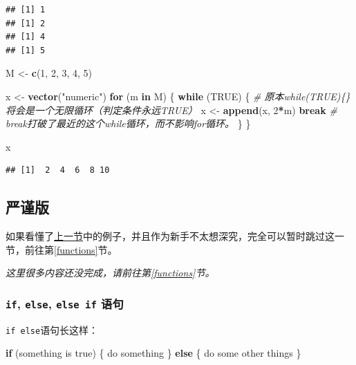 \documentclass[]{book}
\newenvironment{Shaded}{\begin{snugshade}}{\end{snugshade}}
\newcommand{\CommentTok}[1]{\textcolor[rgb]{0.56,0.35,0.01}{\textit{#1}}}
\newcommand{\ControlFlowTok}[1]{\textcolor[rgb]{0.13,0.29,0.53}{\textbf{#1}}}
\newcommand{\DecValTok}[1]{\textcolor[rgb]{0.00,0.00,0.81}{#1}}
\newcommand{\KeywordTok}[1]{\textcolor[rgb]{0.13,0.29,0.53}{\textbf{#1}}}
\newcommand{\NormalTok}[1]{#1}
\newcommand{\OperatorTok}[1]{\textcolor[rgb]{0.81,0.36,0.00}{\textbf{#1}}}
\newcommand{\OtherTok}[1]{\textcolor[rgb]{0.56,0.35,0.01}{#1}}
\newcommand{\StringTok}[1]{\textcolor[rgb]{0.31,0.60,0.02}{#1}}
\begin{document}
\begin{verbatim}
## [1] 1
## [1] 2
## [1] 4
## [1] 5
\end{verbatim}

\begin{Shaded}
\begin{Highlighting}[]
\NormalTok{M <-}\StringTok{ }\KeywordTok{c}\NormalTok{(}\DecValTok{1}\NormalTok{, }\DecValTok{2}\NormalTok{, }\DecValTok{3}\NormalTok{, }\DecValTok{4}\NormalTok{, }\DecValTok{5}\NormalTok{)}

\NormalTok{x <-}\StringTok{ }\KeywordTok{vector}\NormalTok{(}\StringTok{"numeric"}\NormalTok{)}
\ControlFlowTok{for}\NormalTok{ (m }\ControlFlowTok{in}\NormalTok{ M) \{}
  \ControlFlowTok{while}\NormalTok{ (}\OtherTok{TRUE}\NormalTok{) \{ }\CommentTok{# 原本while(TRUE)\{\}将会是一个无限循环（判定条件永远TRUE）}
\NormalTok{    x <-}\StringTok{ }\KeywordTok{append}\NormalTok{(x, }\DecValTok{2}\OperatorTok{*}\NormalTok{m)}
    \ControlFlowTok{break} \CommentTok{# break打破了最近的这个while循环，而不影响for循环。}
\NormalTok{  \}}
\NormalTok{\}}

\NormalTok{x}
\end{Highlighting}
\end{Shaded}

\begin{verbatim}
## [1]  2  4  6  8 10
\end{verbatim}

\hypertarget{control-flow-rigorous}{%
\subsection{严谨版}\label{control-flow-rigorous}}

如果看懂了\protect\hyperlink{kickstart}{上一节}中的例子，并且作为新手不太想深究，完全可以暂时跳过这一节，前往第\ref{functions}节。

\emph{这里很多内容还没完成，请前往第\ref{functions}节。}

\hypertarget{control-flow-rigorous-if-else}{%
\subsubsection{\texorpdfstring{\texttt{if}, \texttt{else}, \texttt{else\ if} 语句}{if, else, else if 语句}}\label{control-flow-rigorous-if-else}}

\texttt{if\ else}语句长这样：

\begin{Shaded}
\begin{Highlighting}[]
\ControlFlowTok{if}\NormalTok{ (something is true) \{}
\NormalTok{  do something}
\NormalTok{\} }\ControlFlowTok{else}\NormalTok{ \{}
\NormalTok{  do some other things }
\NormalTok{\}}
\end{Highlighting}
\end{Shaded}
\end{document}
